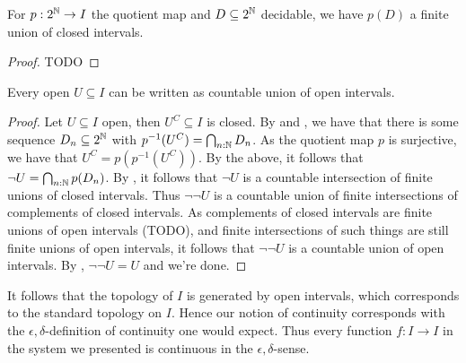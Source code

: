 \begin{corollary}
  For $p:2^{\mathbb{N}} \to I$ the quotient map and $D\subseteq 2^{\mathbb{N}}$ decidable, we have $p(D)$ a finite union of closed intervals. 
\end{corollary}
\begin{proof}
  TODO
\end{proof}

\begin{lemma}
  Every open $U\subseteq I$ can be written as countable union of open intervals.
\end{lemma} 
\begin{proof}
%
%
%
%
%
  Let $U\subseteq I$ open, then $U^C\subseteq I$ is closed. 
  By  and , we have that 
  there is some sequence $D_n\subseteq 2^{\mathbb{N}}$ with $p^{-1}(U^C) = \bigcap_{n:\mathbb{N}} D_n$. 
  As the quotient map $p$ is surjective, we have that $U^C = p(p^{-1}(U^C))$. 
  By the above, it follows that $\neg U = \bigcap_{n:\mathbb{N}} p(D_n)$. 
  By , it follows that 
  $\neg U$ is a countable intersection of finite unions of closed intervals. 
  Thus $\neg\neg U$ is a countable union of finite intersections of complements of closed intervals. 
  As complements of closed intervals are finite unions of open intervals (TODO), 
  and finite intersections of such things are still finite unions of open intervals, 
  it follows that $\neg\neg U$ is a countable union of open intervals. 
  By , $\neg \neg U = U$ and we're done. 

\end{proof}




\begin{remark}
  It follows that the topology of $I$ is generated by open intervals, 
  which corresponds to the standard topology on $I$. 
  Hence our notion of continuity corresponds with the $\epsilon,\delta$-definition of continuity one would expect. 
  Thus every function $f:I\to I$ in the system we presented is continuous in the $\epsilon,\delta$-sense. 
\end{remark}
